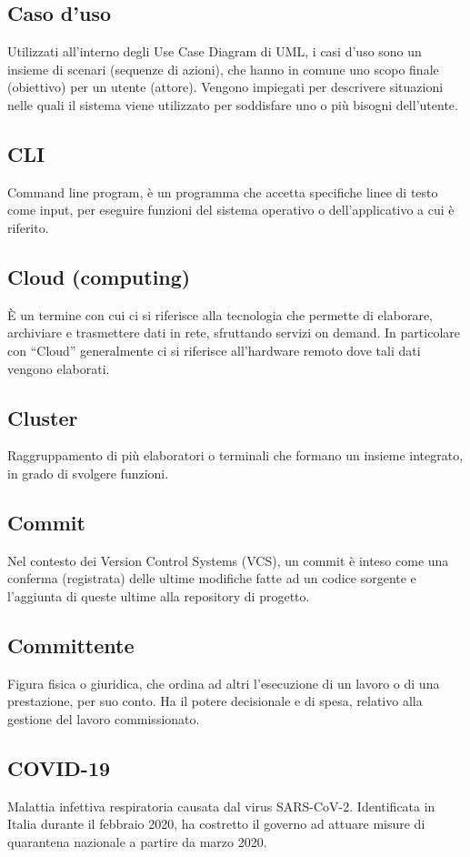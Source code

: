 	\subsection*{Caso d'uso}
	Utilizzati all’interno degli Use Case Diagram di UML, i casi d’uso sono un insieme di scenari (sequenze di azioni), che hanno in comune uno scopo finale (obiettivo) per un utente (attore). Vengono impiegati per descrivere situazioni nelle quali il sistema viene utilizzato per soddisfare uno o più bisogni dell’utente.
	\subsection*{CLI}
	Command line program, è un programma che accetta specifiche linee di testo come input, per eseguire funzioni del sistema operativo o dell’applicativo a cui è riferito.
	\subsection*{Cloud (computing)}
	È un termine con cui ci si riferisce alla tecnologia che permette di elaborare, archiviare e trasmettere dati in rete, sfruttando servizi on demand. In particolare con “Cloud” generalmente ci si riferisce all’hardware remoto dove tali dati vengono elaborati.
	\subsection*{Cluster}
	Raggruppamento di più elaboratori o terminali che formano un insieme integrato, in grado di svolgere funzioni.
	\subsection*{Commit}
	Nel contesto dei Version Control Systems (VCS), un commit è inteso come una conferma (registrata) delle ultime modifiche fatte ad un codice sorgente e l’aggiunta di queste ultime alla repository di progetto.
	\subsection*{Committente}
	Figura fisica o giuridica, che ordina ad altri l’esecuzione di un lavoro o di una prestazione, per suo conto. Ha il potere decisionale e di spesa, relativo alla gestione del lavoro commissionato.
	\subsection*{COVID-19}
	Malattia infettiva respiratoria causata dal virus SARS-CoV-2. Identificata in Italia durante il febbraio 2020, ha costretto il governo ad attuare misure di quarantena nazionale a partire da marzo 2020.
